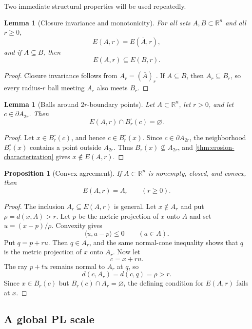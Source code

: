 \documentclass[11pt]{article}
\newtheorem{lemma}[theorem]{Lemma}
\newtheorem{proposition}[theorem]{Proposition}
\newcommand{\R}{\mathbb R}
\numberwithin{equation}{section}
\begin{document}
Two immediate structural properties will be used repeatedly.

\begin{lemma}[Closure invariance and monotonicity]\label{lem:closure-monotone}
For all sets $A,B\subset\R^n$ and all $r\ge0$,
\[
E(A,r)=E(\overline A,r),
\]
and if $A\subseteq B$, then
\[
E(A,r)\subseteq E(B,r).
\]
\end{lemma}

\begin{proof}
Closure invariance follows from $A_r=(\overline A)_r$. If $A\subseteq B$, then $A_r\subseteq B_r$, so every radius-$r$ ball meeting $A_r$ also meets $B_r$.
\end{proof}

\begin{lemma}[Balls around $2r$-boundary points]\label{lem:boundary-ball}
Let $A\subset\R^n$, let $r>0$, and let $c\in\partial A_{2r}$. Then
\[
\boxed{E(A,r)\cap B_r^\circ(c)=\varnothing.}
\]
\end{lemma}

\begin{proof}
Let $x\in B_r^\circ(c)$, and hence $c\in B_r^\circ(x)$. Since $c\in\partial A_{2r}$, the neighborhood $B_r^\circ(x)$ contains a point outside $A_{2r}$. Thus $B_r(x)\nsubseteq A_{2r}$, and \cref{thm:erosion-characterization} gives $x\notin E(A,r)$.
\end{proof}

\begin{proposition}[Convex agreement]\label{prop:convex-agreement}
If $A\subset\R^n$ is nonempty, closed, and convex, then
\[
\boxed{E(A,r)=A_r\qquad(r\ge0).}
\]
\end{proposition}

\begin{proof}
The inclusion $A_r\subseteq E(A,r)$ is general. Let $x\notin A_r$ and put $\rho=d(x,A)>r$. Let $p$ be the metric projection of $x$ onto $A$ and set $u=(x-p)/\rho$. Convexity gives
\[
\langle u,a-p\rangle\le0\qquad(a\in A).
\]
Put $q=p+ru$. Then $q\in A_r$, and the same normal-cone inequality shows that $q$ is the metric projection of $x$ onto $A_r$. Now let
\[
c=x+ru.
\]
The ray $p+tu$ remains normal to $A_r$ at $q$, so
\[
d(c,A_r)=d(c,q)=\rho>r.
\]
Since $x\in B_r(c)$ but $B_r(c)\cap A_r=\varnothing$, the defining condition for $E(A,r)$ fails at $x$.
\end{proof}

\subsection{A global PL scale}\label{subsec:global-scale}
\end{document}
